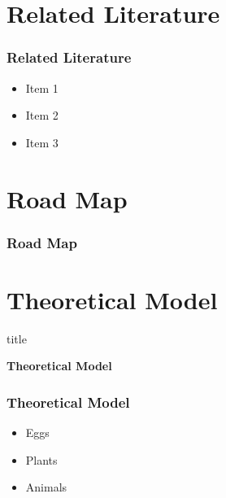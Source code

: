 \documentclass[11pt]{beamer}
\begin{document}
\section[Literature]{Related Literature}
	\begin{frame}

	\frametitle{\bfseries Related Literature}
	
		\begin{itemize}
			\item<1-> Item 1
			\item<2-> Item 2 
			\item<3-> Item 3
		\end{itemize}
		
	\end{frame}
\section{Road Map}
\begin{frame}

	\frametitle{\bfseries Road Map}\label{map}
	
\tableofcontents[sections={5-}]



	
\end{frame}
\section[Theoretical]{Theoretical Model}
\begin{frame}

	
	\begin{beamercolorbox}{title}
		\begin{center}
			\bfseries \huge Theoretical Model
		\end{center}
	\end{beamercolorbox}

\end{frame}

\begin{frame}
	\frametitle{\bfseries Theoretical Model}

		\begin{itemize}
			\item<1-> Eggs
			\item<2-> Plants
			\item<3-> Animals
		\end{itemize}

	
\end{frame}
\end{document}
